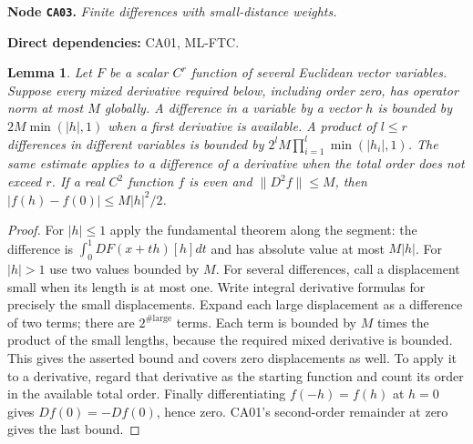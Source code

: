\documentclass[11pt,a4paper]{article}
\newtheorem{lemma}[theorem]{Lemma}
\theoremstyle{remark}\newtheorem{remark}[theorem]{Remark}
\newcommand{\node}[3]{\par\Needspace{6\baselineskip}\smallskip\hypertarget{node:#1}{}\label{nodepage:#1}\noindent\textbf{Node \texttt{#1}.} \textit{#2.}\par\noindent\textbf{Direct dependencies:} #3.\par}
\begin{document}
\node{CA03}{Finite differences with small-distance weights}{CA01, ML-FTC}
\begin{lemma}\label{lem:finitedifferences}
Let $F$ be a scalar $C^r$ function of several Euclidean vector variables. Suppose every mixed derivative required below, including order zero, has operator norm at most $M$ globally. A difference in a variable by a vector $h$ is bounded by $2M\min(|h|,1)$ when a first derivative is available. A product of $l\leq r$ differences in different variables is bounded by
$2^lM\prod_{i=1}^l\min(|h_i|,1)$.
The same estimate applies to a difference of a derivative when the total order does not exceed $r$. If a real $C^2$ function $f$ is even and $\|D^2f\|\leq M$, then
$|f(h)-f(0)|\leq M|h|^2/2$.
\end{lemma}
\begin{proof}
For $|h|\leq1$ apply the fundamental theorem along the segment: the difference is $\int_0^1 DF(x+th)[h]dt$ and has absolute value at most $M|h|$. For $|h|>1$ use two values bounded by $M$. For several differences, call a displacement small when its length is at most one. Write integral derivative formulas for precisely the small displacements. Expand each large displacement as a difference of two terms; there are $2^{\#\mathrm{large}}$ terms. Each term is bounded by $M$ times the product of the small lengths, because the required mixed derivative is bounded. This gives the asserted bound and covers zero displacements as well. To apply it to a derivative, regard that derivative as the starting function and count its order in the available total order. Finally differentiating $f(-h)=f(h)$ at $h=0$ gives $Df(0)=-Df(0)$, hence zero. CA01's second-order remainder at zero gives the last bound.
\end{proof}
\end{document}
